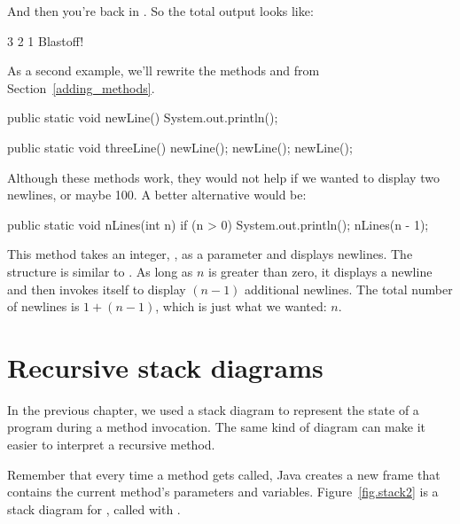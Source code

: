 And then you're back in .
So the total output looks like:

\begin{stdout}
3
2
1
Blastoff!
\end{stdout}

As a second example, we'll rewrite the methods  and  from Section~\ref{adding_methods}.

\begin{code}
public static void newLine() {
    System.out.println();
}

public static void threeLine() {
    newLine();
    newLine();
    newLine();
}
\end{code}


Although these methods work, they would not help if we wanted to display two newlines, or maybe 100.
A better alternative would be:

\begin{code}
public static void nLines(int n) {
    if (n > 0) {
        System.out.println();
        nLines(n - 1);
    }
}
\end{code}

This method takes an integer, , as a parameter and displays  newlines.
The structure is similar to .
As long as $n$ is greater than zero, it displays a newline and then invokes itself to display $(n-1)$ additional newlines.
The total number of newlines is $1 + (n - 1)$, which is just what we wanted: $n$.


\section{Recursive stack diagrams}


In the previous chapter, we used a stack diagram to represent the state of a program during a method invocation.
The same kind of diagram can make it easier to interpret a recursive method.

Remember that every time a method gets called, Java creates a new frame that contains the current method's parameters and variables.
Figure~\ref{fig.stack2} is a stack diagram for , called with .

